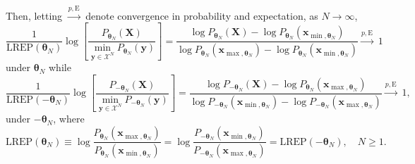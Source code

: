 \documentclass[]{article}
\theoremstyle{definition}
\newcommand{\REP}{\mathrm{LREP}}
\begin{document}
Then, letting \(\stackrel{p, \mathrm{E}}{\longrightarrow}\) denote
convergence in probability and expectation, as \(N\to \infty\), \[
\frac{1}{\REP(\boldsymbol \theta_N)} \log\left[ \frac{P_{\boldsymbol \theta_N }(\boldsymbol X) }{ \displaystyle{\min_{\boldsymbol y\in\mathcal{X}^N}} P_{\boldsymbol \theta_N }(\boldsymbol y)}\right] = \frac{ \log P_{\boldsymbol \theta_N } ( \boldsymbol X)  - \log P_{\boldsymbol \theta_N }(\boldsymbol{x}_{\min, \boldsymbol \theta_N}) }
{ \log P_{\boldsymbol \theta_N } (\boldsymbol{x}_{\max, \boldsymbol \theta_N})  - \log P_{\boldsymbol \theta_N }(\boldsymbol{x}_{\min, \boldsymbol \theta_N}) }
\stackrel{p, \mathrm{E}}{\longrightarrow}
\; 1
\] under \(\boldsymbol\theta_N\) while \[
\frac{1}{\REP(-\boldsymbol \theta_N)} \log\left[ \frac{P_{-\boldsymbol \theta_N }(\boldsymbol X) }{  \displaystyle{\min_{\boldsymbol y\in\mathcal{X}^N}} P_{-\boldsymbol \theta_N }(\boldsymbol y)} \right]
=    \frac{ \log P_{-\boldsymbol \theta_N } ( \boldsymbol X) - \log P_{ \boldsymbol \theta_N }(\boldsymbol{x}_{\max, \boldsymbol \theta_N})    }
{ \log P_{-\boldsymbol \theta_N } (\boldsymbol{x}_{\min, \boldsymbol \theta_N})  - \log P_{-\boldsymbol \theta_N }(\boldsymbol{x}_{\max, \boldsymbol \theta_N}) }
\stackrel{p,\mathrm{E}}{\longrightarrow}
\; 1,
\] under \(-\boldsymbol\theta_N\), where \[
\REP( \boldsymbol \theta_N) \equiv \log \frac{P_{\boldsymbol \theta_N } (\boldsymbol{x}_{\max, \boldsymbol \theta_N})}{P_{\boldsymbol \theta_N }(\boldsymbol{x}_{\min, \boldsymbol \theta_N})} = \log  \frac{P_{-\boldsymbol \theta_N } (\boldsymbol{x}_{\min, \boldsymbol \theta_N}) }{ P_{-\boldsymbol \theta_N }(\boldsymbol{x}_{\max, \boldsymbol \theta_N})}=   \REP( -\boldsymbol \theta_N), \quad N \geq 1.
\]
\end{document}
